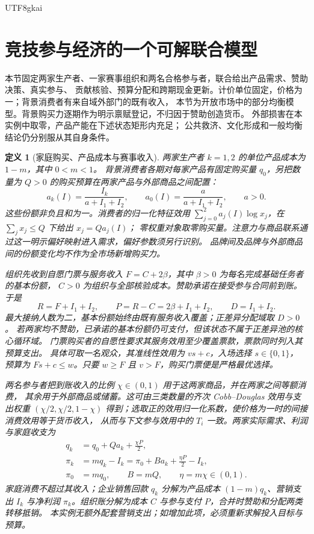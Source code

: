 \documentclass[12pt,a4paper,openany]{report}
\newtheorem{definition}{定义}[chapter]
\begin{document}
\begin{CJK*}{UTF8}{gkai}
\section{竞技参与经济的一个可解联合模型}
\label{sec:constructive-participation-economy}

本节固定两家生产者、一家赛事组织和两名合格参与者，联合给出产品需求、赞助决策、真实参与、
贡献核验、预算分配和跨期现金更新。计价单位固定，价格为一；背景消费者有来自域外部门的既有收入，
本节为开放市场中的部分均衡模型。背景购买力逐期作为明示禀赋登记，不归因于赞助创造货币。
外部损害在本实例中取零，产品产能在下述状态矩形内充足；
公共救济、文化形成和一般均衡结论仍分别服从其自身条件。

\begin{definition}[家庭购买、产品成本与赛事收入]
\label{def:constructive-market}
两家生产者 \(k=1,2\) 的单位产品成本为 \(1-m\)，其中 \(0<m<1\)。
背景消费者各期对每家产品有固定购买量 \(q_0\)，另把数量为 \(Q>0\) 的购买预算在两家产品与外部商品之间配置：
\[
 a_k(I)=\frac{I_k}{a+I_1+I_2},\qquad
 a_0(I)=\frac{a}{a+I_1+I_2},\qquad a>0.
\]
这些份额非负且和为一。消费者的归一化特征效用
\(\sum_{j=0}^2 a_j(I)\log x_j\)，在 \(\sum_jx_j\le Q\) 下给出 \(x_j=Qa_j(I)\)；
零权重对象取零购买量。注意力与商品联系通过这一明示偏好映射进入需求，偏好参数须另行识别。
品牌间及品牌与外部商品间的份额变化均不作为全市场新增购买力。

组织先收到自愿门票与服务收入 \(F=C+2\beta\)，其中 \(\beta>0\) 为每名完成基础任务者的基本份额，
\(C>0\) 为组织与全部核验成本。赞助承诺在接受参与合同前到账。于是
\[
 R=F+I_1+I_2,\qquad P=R-C=2\beta+I_1+I_2,\qquad D=I_1+I_2.
\]
最大接纳人数为二，基本份额始终由既有服务收入覆盖；正差异分配域取 \(D>0\)。
若两家均不赞助，已承诺的基本份额仍可支付，但该状态不属于正差异池的核心循环域。
门票购买者的自愿性要求其服务效用至少覆盖票款，票款同时列入其预算支出。
具体可取一名观众，其准线性效用为 \(v s+c\)，入场选择 \(s\in\{0,1\}\)，
预算为 \(Fs+c\le w\)。只要 \(w\ge F\) 且 \(v>F\)，购买门票便是严格最优选择。

两名参与者把到账收入的比例 \(\chi\in(0,1)\) 用于这两家商品，并在两家之间等额消费，
其余用于外部商品或储蓄。这可由三类数量的齐次 Cobb--Douglas 效用与支出权重
\((\chi/2,\chi/2,1-\chi)\) 得到；选取正的效用归一化系数，使价格为一时的间接消费效用等于货币收入，
从而与下文参与效用中的 \(T_i\) 一致。两家实际需求、利润与家庭收支为
\[
 \begin{aligned}
 q_k&=q_0+Qa_k+\frac{\chi P}{2},\\
 \pi_k&=mq_k-I_k=\pi_0+B a_k+\frac{\eta P}{2}-I_k,\\
 \pi_0&=mq_0,\qquad B=mQ,\qquad \eta=m\chi\in(0,1).
 \end{aligned}
\]
家庭消费不超过其收入；企业销售回款 \(q_k\) 分解为产品成本 \((1-m)q_k\)、营销支出 \(I_k\)
与净利润 \(\pi_k\)。组织账分解为成本 \(C\) 与参与支付 \(P\)，合并时赞助和分配两类转移抵销。
本实例无额外配套营销支出；如增加此项，必须重新求解投入目标与预算。
\end{definition}


\end{CJK*}
\end{document}

